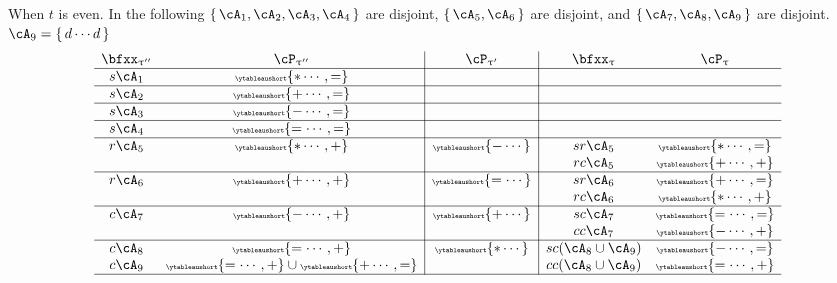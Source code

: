 \documentclass[12pt,a4paper]{amsart}
\numberwithin{equation}{section}
\theoremstyle{remark}
\let\ytb=\ytableaushort
\newcommand{\tytb}[1]{{\tiny\ytb{#1}}}
\def\uptaup{\uptau^{\prime}}
\def\uptaupp{\uptau^{\prime\prime}}
\begin{document}
When $t$ is even.
In the following
$\set{\cA_{1},\cA_{2}, \cA_{3},\cA_{4}}$ are disjoint, $\set{\cA_{5},\cA_{6}}$ are disjoint,
and $\set{\cA_{7},\cA_{8},\cA_{9}}$ %
are disjoint.
$\cA_{9}=\set{d\cdots d}$
\begin{equation} \label{eq:B1-2}
\begin{array}{cc|c|cc}
  \bfxx_{\uptaupp} & \cP_{\uptaupp}         & \cP_{\uptaup} & \bfxx_{\uptau} & \cP_{\uptau} \\
  \hline
  s\cA_{1}              & \tytb{\ast\cdots ,=} &                                                 \\
  \hline
  s\cA_{2}              & \tytb{+\cdots,=}          &                                                 \\
  \hline
  s\cA_{3}              & \tytb{-\cdots,=}          &                                                 \\
  \hline
  s\cA_{4}              & \tytb{=\cdots,=} &                                                 \\
  \hline
  r\cA_{5}              & \tytb{\ast\cdots,+} & \tytb{-\cdots}  & sr\cA_{5} & \tytb{\ast\cdots, =}                            \\
                        &                    &                & rc\cA_{5} &\tytb{+\cdots,+}                                   \\
  \hline
  r\cA_{6}              & \tytb{+\cdots,+} & \tytb{=\cdots}    & sr\cA_{6} &  \tytb{+\cdots,=}                        \\
                        &                    &                & rc\cA_{6} &\tytb{\ast\cdots,+}                                   \\
  \hline
  c\cA_{7}              & \tytb{-\cdots,+}          & \tytb{+\cdots} & sc\cA_{7} & \tytb{=\cdots,=}                                        \\
                        &                    &                & cc\cA_{7} &\tytb{-\cdots,+}                                   \\
  \hline
  c\cA_{8}              & \tytb{=\cdots,+}          & \tytb{\ast\cdots} & sc(\cA_{8}\cup \cA_{9}) & \tytb{-\cdots,=}                                   \\
   c\cA_{9}           &   \tytb{=\cdots,+}\cup \tytb{+\cdots,=}     &                & cc(\cA_{8}\cup \cA_{9}) &\tytb{=\cdots,+}                                   \\
  \hline

\end{array}
\end{equation}
\end{document}
